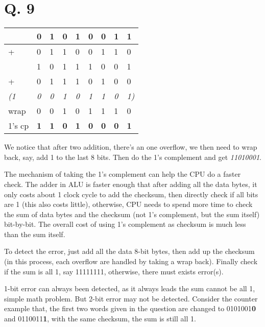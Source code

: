 \documentclass[onecolumn, oneside, ctexart]{SUSTechHomework}
\begin{document}
\section*{Q. 9}

\begin{longtable}[c]{lllllllll}
            & 0          & 1          & 0          & 1          & 0          & 0          & 1          & 1           \\
\endfirsthead
%
\endhead
%
+           & 0          & 1          & 1          & 0          & 0          & 1          & 1          & 0           \\ \hline
            & 1          & 0          & 1          & 1          & 1          & 0          & 0          & 1           \\
+           & 0          & 1          & 1          & 1          & 0          & 1          & 0          & 0           \\ \hline
\textit{(1} & \textit{0} & \textit{0} & \textit{1} & \textit{0} & \textit{1} & \textit{1} & \textit{0} & \textit{1)} \\
wrap        & 0          & 0          & 1          & 0          & 1          & 1          & 1          & 0           \\
1's cp      & \textbf{1} & \textbf{1} & \textbf{0} & \textbf{1} & \textbf{0} & \textbf{0} & \textbf{0} & \textbf{1} 
\end{longtable}
We notice that after two addition, there's an one overflow, we then need to wrap back, say, add 1 to the last 8 bits. Then do the 1's complement and get \emph{11010001}.

\par The mechanism of taking the 1's complement can help the CPU do a faster check. The adder in ALU is faster enough that after adding all the data bytes, it only costs about 1 clock cycle to add the checksum, then directly check if all bits are 1 (this also costs little), otherwise, CPU needs to spend more time to check the sum of data bytes and the checksum (not 1's complement, but the sum itself) bit-by-bit. The overall cost of using 1's complement as checksum is much less than the sum itself.
\par To detect the error, just add all the data 8-bit bytes, then add up the checksum (in this process, each overflow are handled by taking a wrap back). Finally check if the sum is all 1, say 11111111, otherwise, there must exists error(s).
\par 1-bit error can always been detected, as it always leads the sum cannot be all 1, simple math problem. But 2-bit error may not be detected. Consider the counter example that, the first two words given in the question are changed to 0101001\textbf{0} and 0110011\textbf{1}, with the same checksum, the sum is still all 1.
\end{document}
